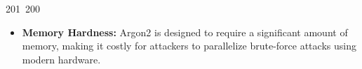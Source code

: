 201~200~\documentclass{article}
\begin{document}
	                                                                                                                                                                                                                                                                                                	                                                                                                                                        	    	                                                                                                	                                                                                                                                                                                                                                                                                                                                	                                                                        	                                                                        	                                                                    \begin{itemize}
	                                                                                                                                                                                                                                                                                                	                                                                                                                                        	    	                                                                                                	                                                                                                                                                                                                                                                                                                                                	                                                                        	                                                                        	                                                                        \item \textbf{Memory Hardness:} Argon2 is designed to require a significant amount of memory, making it costly for attackers to parallelize brute-force attacks using modern hardware.

\end{itemize}
\end{document}
